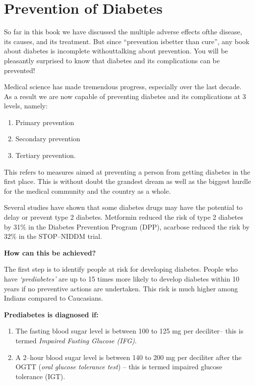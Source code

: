 \chapter{Prevention of Diabetes}\label{chap25}

So far in this book we have discussed the multiple adverse effects of\break the disease, its causes, and its treatment. But since “prevention is\break better than cure”, any book about diabetes is incomplete without\break talking about prevention. You will be pleasantly surprised to know that diabetes and its complications can be prevented!

Medical science has made tremendous progress, especially over the last decade. As a result we are now capable of preventing diabetes and its complications at 3 levels, namely:

\begin{enumerate}
\itemsep=0pt
\item Primary prevention
\item Secondary prevention
\item Tertiary prevention.
\end{enumerate}


This refers to measures aimed at preventing a person from getting diabetes in the first place. This is without doubt the grandest dream as well as the biggest hurdle for the medical community and the country as a whole.

Several studies have shown that some diabetes drugs may have the potential to delay or prevent type 2 diabetes. Metformin reduced the risk of type 2 diabetes by 31\% in the Diabetes Prevention Program (DPP), acarbose reduced the risk by 32\% in the STOP–NIDDM trial.

\noindent\textbf{How can this be achieved?}

The first step is to identify people at risk for developing diabetes. People who have \textit{‘prediabetes’} are up to 15 times more likely to develop diabetes within 10 years if no preventive actions are undertaken. This risk is much higher among Indians compared to Caucasians.

\noindent\textbf{Prediabetes is diagnosed if:}

\begin{enumerate}[•]
\itemsep=0pt
\item The fasting blood sugar level is between 100 to 125 mg per deci\-li\-ter– this is termed \textit{Impaired Fasting Glucose (IFG)}.
\item A 2–hour blood sugar level is between 140 to 200 mg per deciliter after the OGTT (\textit{oral glucose tolerance test}) – this is termed impaired glucose tolerance (IGT).
\end{enumerate}

